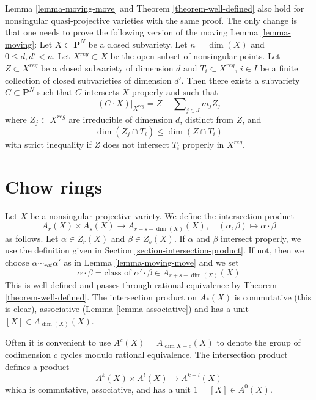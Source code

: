 \begin{remark}
\label{remark-quasi-projective}
Lemma \ref{lemma-moving-move} and Theorem \ref{theorem-well-defined}
also hold for nonsingular quasi-projective varieties with
the same proof. The only change is that one needs to prove the following
version of the moving Lemma \ref{lemma-moving}: Let  $X \subset \mathbf{P}^N$
be a closed subvariety. Let $n = \dim(X)$ and $0 \leq d, d' < n$. Let
$X^{reg} \subset X$ be the open subset of nonsingular points. Let
$Z \subset X^{reg}$ be a closed subvariety of dimension $d$ and
$T_i \subset X^{reg}$, $i \in I$ be a finite collection of closed subvarieties
of dimension $d'$. Then there exists a subvariety $C \subset \mathbf{P}^N$
such that $C$ intersects $X$ properly and such that
$$
(C \cdot X)|_{X^{reg}} = Z + \sum\nolimits_{j \in J} m_j Z_j
$$
where $Z_j \subset X^{reg}$ are irreducible of dimension $d$, distinct
from $Z$, and
$$
\dim(Z_j \cap T_i) \leq \dim(Z \cap T_i)
$$
with strict inequality if $Z$ does not intersect $T_i$ properly in $X^{reg}$.
\end{remark}



\section{Chow rings}
\label{section-chow-rings}

\noindent
Let $X$ be a nonsingular projective variety. We define the intersection
product
$$
A_r(X) \times A_s(X) \longrightarrow A_{r + s - \dim(X)}(X),\quad
(\alpha, \beta) \longmapsto \alpha \cdot \beta
$$
as follows. Let $\alpha \in Z_r(X)$ and $\beta \in Z_s(X)$.
If $\alpha$ and $\beta$ intersect properly, we use the
definition given in Section \ref{section-intersection-product}.
If not, then we choose $\alpha \sim_{rat} \alpha'$ as in
Lemma \ref{lemma-moving-move} and we set
$$
\alpha \cdot \beta =
\text{class of }\alpha' \cdot \beta \in A_{r + s - \dim(X)}(X)
$$
This is well defined and passes through rational equivalence by
Theorem \ref{theorem-well-defined}. The intersection product
on $A_*(X)$ is commutative (this is clear), associative
(Lemma \ref{lemma-associative}) and has a unit $[X] \in A_{\dim(X)}(X)$.

\medskip\noindent
Often it is convenient to use $A^c(X) = A_{\dim X - c}(X)$ to denote the
group of codimension $c$ cycles modulo rational equivalence.
The intersection product defines a product
$$
A^k(X) \times A^l(X) \longrightarrow A^{k+l}(X)
$$
which is commutative, associative, and has a unit $1 = [X] \in A^0(X)$.


